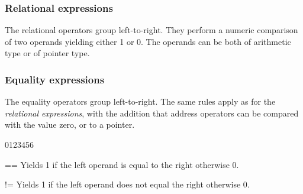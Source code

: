         

\subsubsection{Relational expressions}
\label{sec:RelationalExpression}

The relational operators group left-to-right. They perform a numeric
comparison of two operands yielding either 1 or 0. The operands can be
both of arithmetic type or of pointer type.

\begin{production}
\end{production}

\subsubsection{Equality expressions}
\label{sec:EqualityExpression}

The equality operators group left-to-right. The same rules apply as
for the {\it relational expressions}, with the addition that address
operators can be compared with the value zero, or to a 
pointer.


\begin{production}

\end{production}


\begin{production}
\begin{Ventry3}{0123456}
\item[==] Yields 1 if the left operand is equal to the right otherwise
        0.
\item[!=] Yields 1 if the left operand does not equal the right otherwise
        0.
\end{Ventry3}
\end{production}



